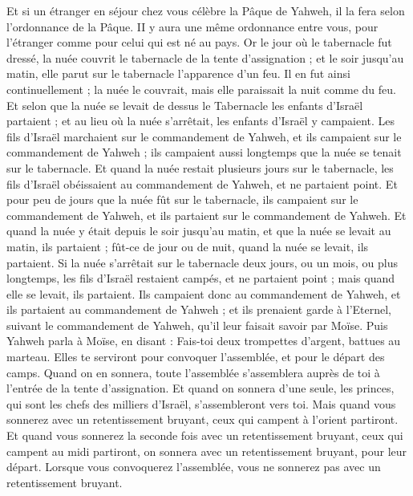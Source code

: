 \begin{multicols}{2}
Et si un étranger en séjour chez vous célèbre la Pâque de Yahweh, il la fera selon l'ordonnance de la Pâque. II y aura une même ordonnance entre vous, pour l'étranger comme pour celui qui est né au pays.
Or le jour où le tabernacle fut dressé, la nuée couvrit le tabernacle de la tente d'assignation ; et le soir jusqu'au matin, elle parut sur le tabernacle l'apparence d'un feu.
Il en fut ainsi continuellement ; la nuée le couvrait, mais elle paraissait la nuit comme du feu.
Et selon que la nuée se levait de dessus le Tabernacle les enfants d'Israël partaient ; et au lieu où la nuée s'arrêtait, les enfants d'Israël y campaient.
Les fils d'Israël marchaient sur le commandement de Yahweh, et ils campaient sur le commandement de Yahweh ; ils campaient aussi longtemps que la nuée se tenait sur le tabernacle.
Et quand la nuée restait plusieurs jours sur le tabernacle, les fils d'Israël obéissaient au commandement de Yahweh, et ne partaient point.
Et pour peu de jours que la nuée fût sur le tabernacle, ils campaient sur le commandement de Yahweh, et ils partaient sur le commandement de Yahweh.
Et quand la nuée y était depuis le soir jusqu'au matin, et que la nuée se levait au matin, ils partaient ; fût-ce de jour ou de nuit, quand la nuée se levait, ils partaient.
Si la nuée s'arrêtait sur le tabernacle deux jours, ou un mois, ou plus longtemps, les fils d'Israël restaient campés, et ne partaient point ; mais quand elle se levait, ils partaient.
Ils campaient donc au commandement de Yahweh, et ils partaient au commandement de Yahweh ; et ils prenaient garde à l'Eternel, suivant le commandement de Yahweh, qu'il leur faisait savoir par Moïse.
\VerseOne{}Puis Yahweh parla à Moïse, en disant :
Fais-toi deux trompettes d'argent, battues au marteau. Elles te serviront pour convoquer l'assemblée, et pour le départ des camps.
Quand on en sonnera, toute l'assemblée s'assemblera auprès de toi à l'entrée de la tente d'assignation.
Et quand on sonnera d'une seule, les princes, qui sont les chefs des milliers d'Israël, s'assembleront vers toi.
Mais quand vous sonnerez avec un retentissement bruyant, ceux qui campent à l'orient partiront.
Et quand vous sonnerez la seconde fois avec un retentissement bruyant, ceux qui campent au midi partiront, on sonnera avec un retentissement bruyant, pour leur départ.
Lorsque vous convoquerez l'assemblée, vous ne sonnerez pas avec un retentissement bruyant.

\end{multicols}
